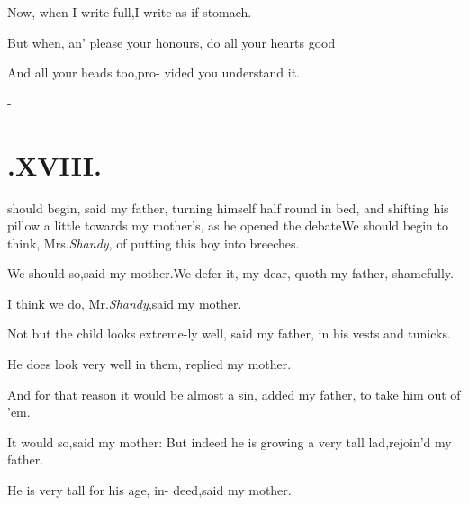 \documentclass[twoside]{article}
\begin{document}
Now, when I write full,\tsk I write as if\break
{}
stomach.\tsh

But when, an’ please your honours,\break 
{}
do all your hearts good\tsh

\tsh And all your heads too,\tsk pro-\break
vided you understand it.

\null\kern-\baselineskip
\section{.\enspace XVIII.}

 should begin, said my father,
turning himself half round in bed, and shifting his pillow a little
towards my mother’s, as he opened the debate\tsh We
should begin to think, Mrs.\@ \textit{Shandy}, of putting this boy into
breeches.\tsh

We should so,\tsk said my mother.\tsh We defer it, my
dear, quoth my father, shamefully.\tsh

I think we do, Mr.\@ \textit{Shandy},\tsk said my mother.

\tsh Not but the child looks extreme-\break ly well, said my
father, in his vests and tunicks.\tsh{}

\tsh He does look very well in them,\break
\tsk replied my mother.\tsh

\tsh And for that reason it would be\break
almost a sin, added my father, to take\break
him out of ’em.\tsh

\tsh It would so,\tsk said my mother:\break
\tsh But indeed he is growing a very\break
tall lad,\tsk rejoin’d my father.

\tsh He is very tall for his age, in-\break 
deed,\tsk said my mother.\tsh
\end{document}
